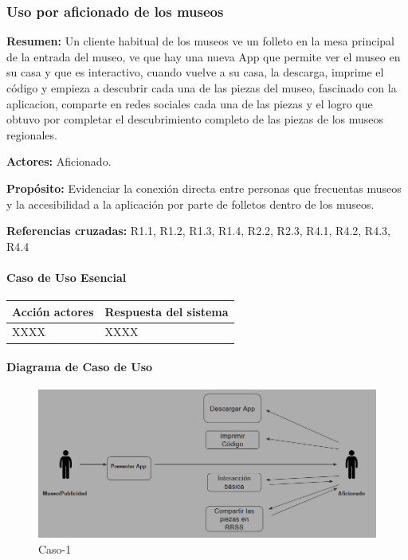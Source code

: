 \subsubsection{Uso por aficionado de los museos}

{\textbf {Resumen:}}
Un cliente habitual de los museos ve un folleto en la mesa principal de la entrada del museo, ve que hay una nueva App que permite ver el museo en su casa y que es interactivo, cuando vuelve a su casa, la descarga, imprime el código y empieza a descubrir cada una de las piezas del museo, fascinado con la aplicacion, comparte en redes sociales cada una de las piezas y el logro que obtuvo por completar el descubrimiento completo de las piezas de los museos regionales.

{\textbf {Actores:}}
Aficionado.

{\textbf {Propósito:}}
Evidenciar la conexión directa entre personas que frecuentas museos y la accesibilidad a la aplicación por parte de folletos dentro de los museos.

{\textbf {Referencias cruzadas:}}
R1.1, R1.2, R1.3, R1.4, R2.2, R2.3, R4.1, R4.2, R4.3, R4.4

\paragraph{Caso de Uso Esencial}

\begin{longtable}{|p{5cm}|p{8cm}|}
\hline 
Acción actores & Respuesta del sistema \\ 
\hline 
XXXX & XXXX \\ 
\hline 
\end{longtable}

\paragraph{Diagrama de Caso de Uso}

\begin{figure}[H]
\centerline{\includegraphics[width=15cm]{imgs/CasoUso_6.PNG}}
\caption{Caso-1}
\label{fig}
\end{figure}

